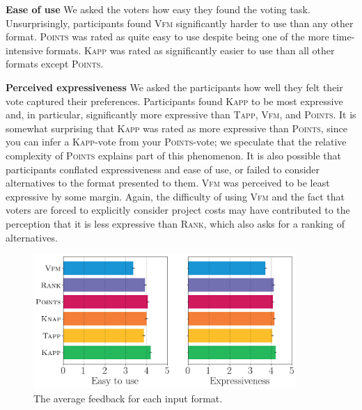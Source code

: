 \documentclass{comsoc2023}
\newcommand{\points}{\textsc{Points}}
\newcommand{\rank}{\textsc{Rank}}
\newcommand{\vfm}{\textsc{Vfm}}
\newcommand{\kapp}{\textsc{Kapp}}
\newcommand{\tapp}{\textsc{Tapp}}
\begin{document}
\textbf{Ease of use}  We asked the voters how easy they found the voting task. Unsurprisingly, participants found \vfm{} significantly harder to use than any other format. \points{} was rated as quite easy to use despite being one of the more time-intensive formats. \kapp{} was rated as significantly easier to use than all other  formats except \points. 


\textbf{Perceived expressiveness} We asked the participants how well they felt their vote captured their preferences. 
Participants found \kapp{} to be most expressive and, in particular,  significantly more expressive than  \tapp, \vfm, and \points. It is somewhat surprising that \kapp{} was rated as more expressive than \points, since you can infer a \kapp-vote from  your \points-vote; we speculate that the relative complexity of  \points{} explains part of this phenomenon. It is also possible that participants conflated expressiveness and ease of use, or failed to consider alternatives to the format presented to them. %
\vfm{} was perceived to be least expressive by some margin. Again, the  difficulty of using \vfm{} and the fact that voters are forced to explicitly consider project costs may have contributed to the perception that it is less expressive than \rank, which also asks for a ranking of alternatives.  


\begin{figure}[!h]
\begin{center}
\includegraphics[width=10cm]{experiment/survey1.png}
\caption{The average feedback for each input format.
}\label{fig:feedback}
\end{center}\vspace{-3mm}
\end{figure}
\end{document}
